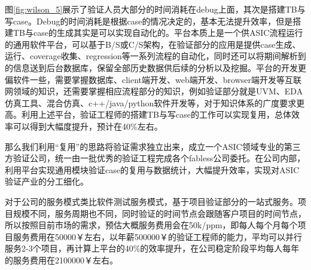 \documentclass[a4paper,11pt]{article}
\begin{document}
图\ref{fig:wilson_5}展示了验证人员大部分的时间消耗在debug上面，其次是搭建TB与写case。Debug的时间消耗是根据case的情况决定的，基本无法提升效率，但是搭建TB与case的生成其实是可以实现自动化的。平台本质上是一个供ASIC流程运行的通用软件平台，可以基于B/S或C/S架构，在验证部分的应用是提供case生成、运行、coverage收集、regression等一系列流程的自动化，同时还可以将期间解析到的信息送到后台数据库，保留全部历史数据供后续的分析以及挖掘。平台的开发更偏软件一些，需要掌握数据库、client端开发、web端开发、browser端开发等互联网领域的知识，还需要掌握相应流程部分的知识，例如验证部分就是UVM、EDA仿真工具、混合仿真、c++/java/python软件开发等，对于知识体系的广度要求更高。利用上述平台，验证工程师的搭建TB与写case的工作可以实现复用，总体效率可以得到大幅度提升，预计在40\%左右。

那么我们利用“复用”的思路将验证需求独立出来，成立一个ASIC领域专业的第三方验证公司，统一由一批优秀的验证工程完成各个fabless公司委托。在公司内部，利用平台实现通用模块验证case的复用与数据统计，大幅提升效率，实现对ASIC验证产业的分工细化。

对于公司的服务模式类比软件测试服务模式，基于项目验证部分的一站式服务。项目规模不同，服务周期也不同，同时验证的时间节点会跟随客户项目的时间节点，所以按照目前市场的需求，预估大概服务费用会在50k/ppm，即每人每个月每个项目服务费用在50000￥左右，以年薪500000￥的验证工程师的能力，平均可以并行服务2-3个项目，再计算上平台的40\%的效率提升，在公司稳定阶段平均每人每年的服务费用在2100000￥左右。
\pagebreak
\end{document}
